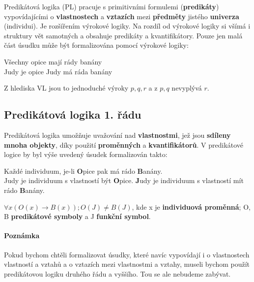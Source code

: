 Predikátová logika (PL) pracuje s primitivními formulemi (\textbf{predikáty}) vypovídajícími o \textbf{vlastnostech} a \textbf{vztazích} mezi \textbf{předměty} jistého \textbf{univerza} (individui). Je rozšířením výrokové logiky. Na rozdíl od výrokové logiky si všímá i struktury vět samotných a obsahuje predikáty a kvantifikátory. Pouze jen malá část úsudku může být formalizována pomocí výrokové logiky:

\begin{center}
\begin{minipage}{0.5\textwidth}
Všechny opice mají rády banány
\\
Judy je opice
\resline
Judy má ráda banány
\end{minipage}
\end{center}

Z hlediska VL jsou to jednoduché výroky
$p, q, r$ a z $p, q$ nevyplývá $r$.


\subsection{Predikátová logika 1. řádu}
Predikátová logika umožňuje uvažování nad \textbf{vlastnostmi}, jež jsou \textbf{sdíleny mnoha objekty}, díky použití \textbf{proměnných} a \textbf{kvantifikátorů}. V predikátové logice by byl výše uvedený úsudek formalizován takto:

\begin{center}
\begin{minipage}{0.7\textwidth}
Každé individuum, je-li \textbf{O}pice pak má rádo \textbf{B}anány.\\
{J}udy je individuum s vlastností být \textbf{O}pice.
\resline
\textbf{J}udy je individuum s vlastností mít rádo \textbf{B}anány.
\end{minipage}
\end{center}

$\forall x (O(x) \rightarrow B(x)); O(J) \neq B(J)$, kde x je \textbf{individuová proměnná}; O, B \textbf{predikátové symboly} a J \textbf{funkční symbol}.

\paragraph*{Poznámka} Pokud bychom chtěli formalizovat úsudky, které navíc vypovídají i o vlastnostech vlastností a vztahů a o vztazích mezi vlastnostmi a vztahy, museli bychom použít predikátovou logiku druhého řádu a vyššího. Tou se ale nebudeme zabývat.

